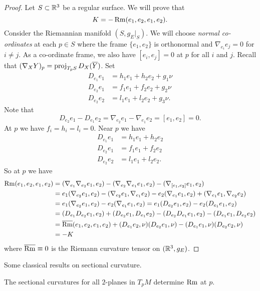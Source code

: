 \begin{proof}
  Let $S \subset \mathbb{R}^3$ be a regular surface.
  We will prove that
  \[ K = -\operatorname{Rm}(e_1,e_2,e_1,e_2). \]
  Consider the Riemannian manifold $(S,g_E|_S)$.
  We will choose \emph{normal co-ordinates} at each $p\in S$ where the frame $\{e_1,e_2\}$ is orthonormal and $\nabla_{e_i}e_j=0$ for $i\neq j$.
  As a co-ordinate frame, we also have $[e_i,e_j]=0$ at $p$ for all $i$ and $j$.
  Recall that $(\nabla_XY)_p = \operatorname{proj}_{T_pS}D_X(\overline Y)$.
  Set
  \begin{align*}
    D_{e_1}e_1 &= h_1e_1+h_2e_2+g_1\nu \\
    D_{e_2}e_1 &= f_1e_1+f_2e_2+g_2\nu \\
    D_{e_2}e_2 &= l_1e_1+l_2e_2+g_3\nu.
  \end{align*}
  Note that
  \[ D_{e_2}e_1-D_{e_1}e_2 = \nabla_{e_2}e_1-\nabla_{e_1}e_2 = [e_1,e_2] = 0. \]
  At $p$ we have $f_i=h_i=l_i=0$.
  Near $p$ we have
  \begin{align*}
    D_{e_1}e_1 &= h_1e_1+h_2e_2 \\
    D_{e_2}e_1 &= f_1e_1+f_2e_2 \\
    D_{e_2}e_2 &= l_1e_1+l_2e_2.
  \end{align*}
  So at $p$ we have
  \begin{align*}
    \operatorname{Rm}(e_1,e_2,e_1,e_2) &= (\nabla_{e_1}\nabla_{e_2}e_1,e_2) - (\nabla_{e_2}\nabla_{e_1}e_1,e_2) - (\nabla_{[e_1,e_2]}e_1,e_2) \\
    &= e_1(\nabla_{e_2}e_1,e_2) - (\nabla_{e_2}e_1,\nabla_{e_1}e_2) - e_2(\nabla_{e_1}e_1,e_2) + (\nabla_{e_1}e_1,\nabla_{e_2}e_2) \\
    &= e_1(\nabla_{e_2}e_1,e_2) - e_2(\nabla_{e_1}e_1,e_2) = e_1(D_{e_2}e_1,e_2) - e_2(D_{e_1}e_1,e_2) \\
    &= (D_{e_1}D_{e_2}e_1,e_2) + (D_{e_2}e_1,D_{e_1}e_2) - (D_{e_2}D_{e_1}e_1,e_2) - (D_{e_1}e_1,D_{e_2}e_2) \\
    &= \overline{\operatorname{Rm}}(e_1,e_2,e_1,e_2) + (D_{e_1}e_2,\nu)(D_{e_2}e_1,\nu) - (D_{e_1}e_1,\nu)(D_{e_2}e_2,\nu) \\
    &= -K
  \end{align*}
  where $\overline{\operatorname{Rm}}\equiv0$ is the Riemann curvature tensor on $(\mathbb{R}^3,g_E)$.
\end{proof}

Some classical results on sectional curvature.

\begin{prop}
  The sectional curvatures for all $2$-planes in $T_pM$ determine $\operatorname{Rm}$ at $p$.
\end{prop}

